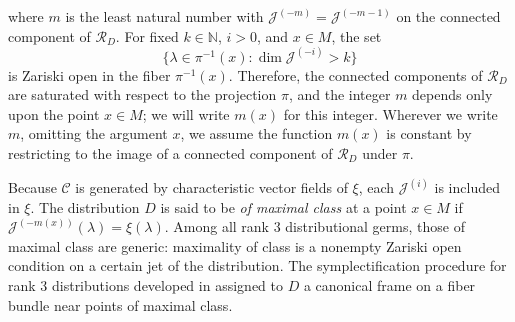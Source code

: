 \documentclass[11pt,letterpaper]{amsart}
\numberwithin{equation}{section}
\begin{document}
where $m$ is the least natural number with $\mathcal{J}^{(-m)} = \mathcal{J}^{(-m-1)}$ on the connected component of $\mathcal{R}_D$. For fixed $k\in \mathbb{N}$, $i>0$, and $x\in M$, the set
\begin{equation}
    \{\lambda\in \pi^{-1}(x): \dim\mathcal{J}^{(-i)}>k\}
\end{equation}
is Zariski open in the fiber $\pi^{-1}(x)$. Therefore, the connected components of $\mathcal{R}_D$ are saturated with respect to the projection $\pi$, and the integer $m$ depends only upon the point $x\in M$; we will write $m(x)$ for this integer. Wherever we write $m$, omitting the argument $x$, we assume the function $m(x)$ is constant by restricting to the image of a connected component of $\mathcal{R}_D$ under $\pi$.

Because $\mathcal C$ is generated by characteristic vector fields of $\xi$, each $\mathcal{J}^{(i)}$ is included in $\xi$. The distribution $D$ is said to be \emph{of maximal class} at a point $x\in M$ if $\mathcal{J}^{(-m(x))}(\lambda)=\xi(\lambda)$. Among all rank $3$ distributional germs, those of maximal class are generic: maximality of class is a nonempty Zariski open condition on a certain jet of the distribution. The symplectification procedure for rank 3 distributions developed in \cite{doubrov2008rank3} assigned to $D$ a canonical frame on a fiber bundle near points of maximal class.
\end{document}
